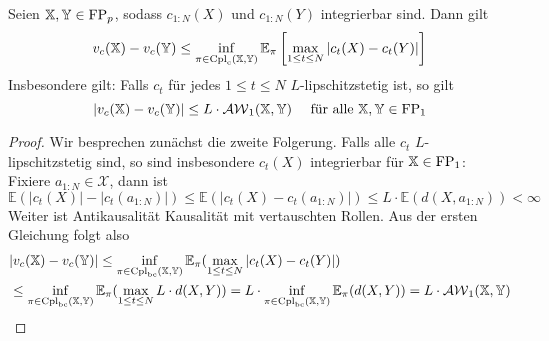 \begin{proposition}
    Seien $\mathbb{X,Y} \in \operatorname{FP}_p$, sodass $c_{1:N}(X)$ und $c_{1:N}(Y)$ integrierbar sind. Dann gilt
    $$v_c(\mathbb{X}) - v_c(\mathbb{Y}) \leq \inf_{\pi \in \operatorname{Cpl}_{\operatorname{c}}(\mathbb{X,Y})} \mathbb{E}_\pi \left[\max_{1\leq t\leq N} |c_t(X) - c_t(Y)|\right] $$
    Insbesondere gilt: Falls $c_t$ für jedes $1\leq t \leq N$ $L$-lipschitzstetig ist, so gilt 
    $$|v_c(\mathbb{X}) - v_c(\mathbb{Y})| \leq L \cdot \mathcal{AW}_1(\mathbb{X,Y}) \quad \text{ für alle } \mathbb{X,Y} \in \operatorname{FP}_1$$
\end{proposition}
\begin{proof}
Wir besprechen zunächst die zweite Folgerung. Falls alle $c_t$ $L$-lipschitzstetig sind, so sind insbesondere $c_t(X)$ integrierbar für $\mathbb{X} \in \operatorname{FP}_1$: Fixiere $a_{1:N} \in \mathcal{X}$, dann ist 
$$\mathbb{E}(|c_t(X)| - |c_t(a_{1:N})|) \leq \mathbb{E}(|c_t(X) - c_t(a_{1:N})|) \leq L \cdot\mathbb{E}(d(X, a_{1:N})) < \infty$$
Weiter ist Antikausalität Kausalität mit vertauschten Rollen. Aus der ersten Gleichung folgt also
\begin{align*}
    &|v_c(\mathbb{X}) - v_c(\mathbb{Y}) | \leq \inf_{\pi \in \operatorname{Cpl}_{\operatorname{bc}}(\mathbb{X,Y})} \mathbb{E}_\pi(\max_{1\leq t\leq N}|c_t(X) - c_t(Y)|) \\
    &\leq \inf_{\pi \in \operatorname{Cpl}_{\operatorname{bc}}(\mathbb{X,Y})} \mathbb{E}_\pi(\max_{1\leq t\leq N}L\cdot d(X,Y)) 
    = L \cdot \inf_{\pi \in \operatorname{Cpl}_{\operatorname{bc}}(\mathbb{X,Y})} \mathbb{E}_\pi(d(X,Y)) 
    = L\cdot \mathcal{AW}_1(\mathbb{X,Y})
\end{align*}
 

\end{proof}
